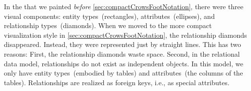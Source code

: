 %
\label{sec:relationalModel}%
%
In the  that we painted \emph{before} \cref{sec:compactCrowsFootNotation}, there were three visual components:
entity types~(rectangles), attributes~(ellipses), and relationship types~(diamonds).
When we moved to the more compact visualization style in \cref{sec:compactCrowsFootNotation}, the relationship diamonds disappeared.
Instead, they were represented just by straight lines.
This has two reasons:
First, the relationship diamonds waste space.
Second, in the relational data model, relationships do not exist as independent objects.
In this model, we only have entity types~(embodied by tables) and attributes~(the columns of the tables).
Relationships are realized as foreign keys, i.e., as special attributes.%
%
%
%
%
%
\endhsection%
%
